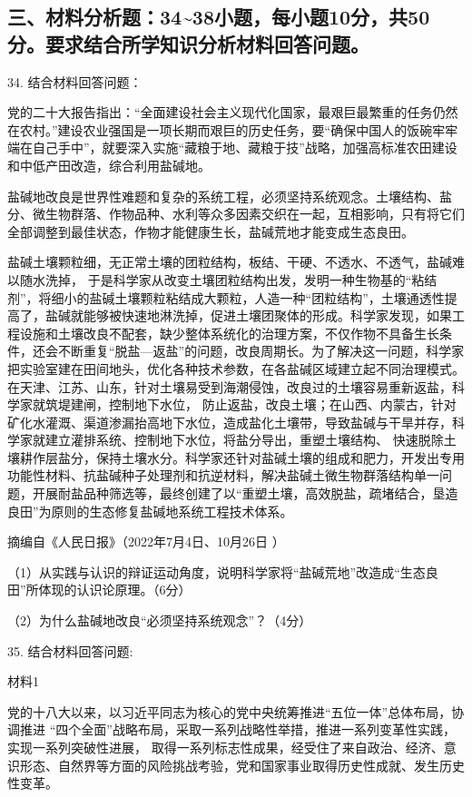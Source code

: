 \documentclass[UTF8,11pt]{ctexart}
\begin{document}
\subsection*{三、材料分析题：34\textasciitilde{}38小题，每小题10分，共50分。要求结合所学知识分析材料回答问题。}

34. 结合材料回答问题：

党的二十大报告指出：“全面建设社会主义现代化国家，最艰巨最繁重的任务仍然在农村。”建设农业强国是一项长期而艰巨的历史任务，要“确保中国人的饭碗牢牢端在自己手中”，就要深入实施“藏粮于地、藏粮于技”战略，加强高标准农田建设和中低产田改造，综合利用盐碱地。

盐碱地改良是世界性难题和复杂的系统工程，必须坚持系统观念。土壤结构、盐分、微生物群落、作物品种、水利等众多因素交织在一起，互相影响，只有将它们全部调整到最佳状态，作物才能健康生长，盐碱荒地才能变成生态良田。

盐碱土壤颗粒细，无正常土壤的团粒结构，板结、干硬、不透水、不透气，盐碱难以随水洗掉， 于是科学家从改变土壤团粒结构出发，发明一种生物基的“粘结剂”，将细小的盐碱土壤颗粒粘结成大颗粒，人造一种“团粒结构”，土壤通透性提高了，盐碱就能够被快速地淋洗掉，促进土壤团聚体的形成。科学家发现，如果工程设施和土壤改良不配套，缺少整体系统化的治理方案，不仅作物不具备生长条件，还会不断重复“脱盐—返盐”的问题，改良周期长。为了解决这一问题，科学家把实验室建在田间地头，优化各种技术参数，在各盐碱区域建立起不同治理模式。在天津、江苏、山东，针对土壤易受到海潮侵蚀，改良过的土壤容易重新返盐，科学家就筑堤建闸，控制地下水位， 防止返盐，改良土壤；在山西、内蒙古，针对矿化水灌溉、渠道渗漏抬高地下水位，造成盐化土壤带，导致盐碱与干旱并存，科学家就建立灌排系统、控制地下水位，将盐分导出，重塑土壤结构、 快速脱除土壤耕作层盐分，保持土壤水分。科学家还针对盐碱土壤的组成和肥力，开发出专用功能性材料、抗盐碱种子处理剂和抗逆材料，解决盐碱土微生物群落结构单一问题，开展耐盐品种筛选等，最终创建了以“重塑土壤，高效脱盐，疏堵结合，垦造良田”为原则的生态修复盐碱地系统工程技术体系。

摘编自《人民日报》（2022年7月4日、10月26日 ）

（1）从实践与认识的辩证运动角度，说明科学家将“盐碱荒地”改造成“生态良田”所体现的认识论原理。（6分）

（2）为什么盐碱地改良“必须坚持系统观念”？（4分）

35. 结合材料回答问题:

材料1

党的十八大以来，以习近平同志为核心的党中央统筹推进“五位一体”总体布局，协调推进 “四个全面”战略布局，采取一系列战略性举措，推进一系列变革性实践，实现一系列突破性进展， 取得一系列标志性成果，经受住了来自政治、经济、意识形态、自然界等方面的风险挑战考验，党和国家事业取得历史性成就、发生历史性变革。
\end{document}
